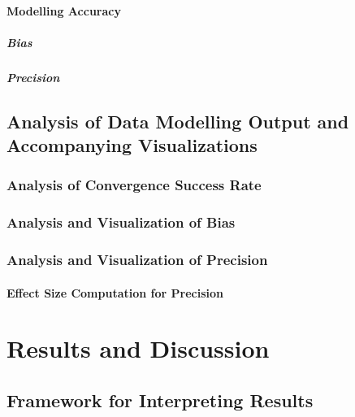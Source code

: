 \documentclass[
12pt, %
twoside,
english]{guelphthesis}
\begin{document}
\hypertarget{modelling-accuracy}{%
\paragraph{Modelling Accuracy}\label{modelling-accuracy}}

\hypertarget{bias-comp}{%
\subparagraph{Bias}\label{bias-comp}}

\hypertarget{pres-precision}{%
\subparagraph{Precision}\label{pres-precision}}

\hypertarget{analysis-visualization}{%
\subsection{Analysis of Data Modelling Output and Accompanying Visualizations}\label{analysis-visualization}}

\hypertarget{convergence-analysis}{%
\subsubsection{Analysis of Convergence Success Rate}\label{convergence-analysis}}

\hypertarget{bias-analysis}{%
\subsubsection{Analysis and Visualization of Bias}\label{bias-analysis}}

\hypertarget{precision-analysis}{%
\subsubsection{Analysis and Visualization of Precision}\label{precision-analysis}}

\hypertarget{effect-size-computation-for-precision}{%
\paragraph{Effect Size Computation for Precision}\label{effect-size-computation-for-precision}}

\hypertarget{results-and-discussion}{%
\section{Results and Discussion}\label{results-and-discussion}}

\hypertarget{framework-for-interpreting-results}{%
\subsection{Framework for Interpreting Results}\label{framework-for-interpreting-results}}
\end{document}
